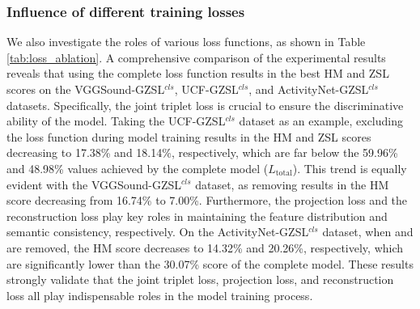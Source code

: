 \documentclass[lettersize,journal]{IEEEtran}
\begin{document}
\subsubsection{Influence of different training losses}
We also investigate the roles of various loss functions, as shown in Table \ref{tab:loss_ablation}. A comprehensive comparison of the experimental results reveals that using the complete loss function results in the best HM and ZSL scores on the VGGSound-GZSL$^{\textit{cls}}$, UCF-GZSL$^{\textit{cls}}$, and ActivityNet-GZSL$^{\textit{cls}}$ datasets. Specifically, the joint triplet loss  is crucial to ensure the discriminative ability of the model. Taking the UCF-GZSL$^{\textit{cls}}$ dataset as an example, excluding the loss function  during model training results in the HM and ZSL scores decreasing to 17.38\% and 18.14\%, respectively, which are far below the 59.96\% and 48.98\% values achieved by the complete model ($L_{\mathrm{total}}$). This trend is equally evident with the VGGSound-GZSL$^{\textit{cls}}$ dataset, as removing  results in the HM score decreasing from 16.74\% to 7.00\%. Furthermore, the projection loss  and the reconstruction loss  play key roles in maintaining the feature distribution and semantic consistency, respectively. On the ActivityNet-GZSL$^{\textit{cls}}$ dataset, when  and  are removed, the HM score decreases to 14.32\% and 20.26\%, respectively, which are significantly lower than the 30.07\% score of the complete model. These results strongly validate that the joint triplet loss, projection loss, and reconstruction loss all play indispensable roles in the model training process.
\end{document}
